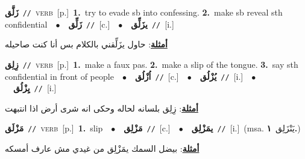 \documentclass[10pt,a4paper,twoside]{article} %
\begin{document}
\begin{multicols}{2}
{\setlength\topsep{0pt}\textbf{\foreignlanguage{arabic}{زَلَّق}}\ {\color{gray}\texttt{//}\color{black}}\ \textsc{verb}\ [p.]\ \textbf{1.}~try to evade sb into confessing.  \textbf{2.}~make sb reveal sth confidential\ \ $\bullet$\ \ \setlength\topsep{0pt}\textbf{\foreignlanguage{arabic}{زَلِّق}}\ {\color{gray}\texttt{//}\color{black}}\ [c.]\ \ $\bullet$\ \ \setlength\topsep{0pt}\textbf{\foreignlanguage{arabic}{يزَلِّق}}\ {\color{gray}\texttt{//}\color{black}}\ [i.]\  \begin{flushright}\color{gray}\foreignlanguage{arabic}{\textbf{\underline{\foreignlanguage{arabic}{أمثلة}}}: حاول يزَلِّقني بالكلام بس أنا كنت صاحيله}\end{flushright}\color{black}} \vspace{2mm}

{\setlength\topsep{0pt}\textbf{\foreignlanguage{arabic}{زِلِق}}\ {\color{gray}\texttt{//}\color{black}}\ \textsc{verb}\ [p.]\ \textbf{1.}~make a faux pas.  \textbf{2.}~make a slip of the tongue.  \textbf{3.}~say sth confidential in front of people\ \ $\bullet$\ \ \setlength\topsep{0pt}\textbf{\foreignlanguage{arabic}{اُزْلُق}}\ {\color{gray}\texttt{//}\color{black}}\ [c.]\ \ $\bullet$\ \ \setlength\topsep{0pt}\textbf{\foreignlanguage{arabic}{يُزْلُق}}\ {\color{gray}\texttt{//}\color{black}}\ [i.]\ \ $\bullet$\ \ \setlength\topsep{0pt}\textbf{\foreignlanguage{arabic}{يِزْلُق}}\ {\color{gray}\texttt{//}\color{black}}\ [i.]\  \begin{flushright}\color{gray}\foreignlanguage{arabic}{\textbf{\underline{\foreignlanguage{arabic}{أمثلة}}}: زِلِق بلسانه لحاله وحكى انه شرى أرض اذا انتبهت}\end{flushright}\color{black}} \vspace{2mm}

{\setlength\topsep{0pt}\textbf{\foreignlanguage{arabic}{مَزْلَق}}\ {\color{gray}\texttt{//}\color{black}}\ \textsc{verb}\ [p.]\ \textbf{1.}~slip\ \ $\bullet$\ \ \setlength\topsep{0pt}\textbf{\foreignlanguage{arabic}{مَزْلِق}}\ {\color{gray}\texttt{//}\color{black}}\ [c.]\ \ $\bullet$\ \ \setlength\topsep{0pt}\textbf{\foreignlanguage{arabic}{يمَزْلِق}}\ {\color{gray}\texttt{//}\color{black}}\ [i.]\ \color{gray}(msa. \foreignlanguage{arabic}{يَنْزَلِق}~\foreignlanguage{arabic}{\textbf{١.}})\color{black}\  \begin{flushright}\color{gray}\foreignlanguage{arabic}{\textbf{\underline{\foreignlanguage{arabic}{أمثلة}}}: بيضل السمك يمَزْلِق من غيدي مش عارف أمسكه}\end{flushright}\color{black}} \vspace{2mm}


\end{multicols}
\end{document}
